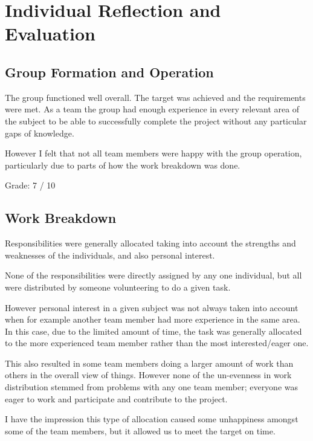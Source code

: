 \documentclass[a4paper,10pt]{article}
\title{}
\author{}
\begin{document}
\section{Individual Reflection and Evaluation}
\subsection{Group Formation and Operation}
The group functioned well overall. The target was achieved and the requirements
were met. As a team the group had enough experience in every relevant area of
the subject to be able to successfully complete the project without any particular
gaps of knowledge.

However I felt that not all team members were happy with the group operation, particularly
due to parts of how the work breakdown was done.

Grade: 7 / 10


\subsection{Work Breakdown}
Responsibilities were generally allocated taking into account the strengths
and weaknesses of the individuals, and also personal interest.

None of the responsibilities were directly assigned by any one individual, but
all were distributed by someone volunteering to do a given task.

However personal interest in a given subject was not always taken into account
when for example another team member had more experience in the same area. In this
case, due to the limited amount of time, the task was generally allocated to
the more experienced team member rather than the most interested/eager one.

This also resulted in some team members doing a larger amount of work than others
in the overall view of things. However none of the un-evenness in work distribution
stemmed from problems with any one team member; everyone was eager to work and
participate and contribute to the project.

I have the impression this type of allocation caused some unhappiness amongst
some of the team members, but it allowed us to meet the target on time.
\end{document}
